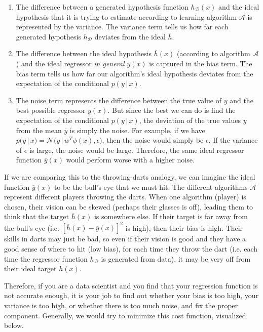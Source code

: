 \documentclass{article}
\begin{document}
  \begin{enumerate}
    \item The difference between a generated hypothesis function $h_\mathcal{D}(x)$ and the ideal hypothesis that it is trying to estimate according to learning algorithm $\mathcal{A}$ is represented by the variance. The variance term tells us how far each generated hypothesis $h_\mathcal{D}$ deviates from the ideal $\overline{h}$.
    
    \item The difference between the ideal hypothesis $\overline{h}(x)$ (according to algorithm $\mathcal{A}$) and the ideal regressor \textit{in general} $\overline{y}(x)$ is captured in the bias term. The bias term tells us how far our algorithm's ideal hypothesis deviates from the expectation of the conditional $p(y\,|\,x)$.
    
    \item The noise term represents the difference between the true value of $y$ and the best possible regressor $\overline{y}(x)$. But since the best we can do is find the expectation of the conditional $p(y\,|\,x)$, the deviation of the true values $y$ from the mean $\overline{y}$ is simply the noise. For example, if we have $p(y\,|\,x) = \mathcal{N} \big( y\,|\, w^T\phi(x), \epsilon \big)$, then the noise would simply be $\epsilon$. If the variance of $\epsilon$ is large, the noise would be large. Therefore, the same ideal regressor function $\overline{y}(x)$ would perform worse with a higher noise.
  \end{enumerate}

  If we are comparing this to the throwing-darts analogy, we can imagine the ideal function $\overline{y}(x)$ to be the bull's eye that we must hit. The different algorithms $\mathcal{A}$ represent different players throwing the darts. When one algorithm (player) is chosen, their vision can be skewed (perhaps their glasses is off), leading them to think that the target $\overline{h}(x)$ is somewhere else. If their target is far away from the bull's eye (i.e. $[\overline{h}(x) - \overline{y}(x)]^2$ is high), then their bias is high. Their skills in darts may just be bad, so even if their vision is good and they have a good sense of where to hit (low bias), for each time they throw the dart (i.e. each time the regressor function $h_\mathcal{D}$ is generated from data), it may be very off from their ideal target $\overline{h}(x)$.

  Therefore, if you are a data scientist and you find that your regression function is not accurate enough, it is your job to find out whether your bias is too high, your variance is too high, or whether there is too much noise, and fix the proper component. Generally, we would try to minimize this cost function, visualized below.
\end{document}
